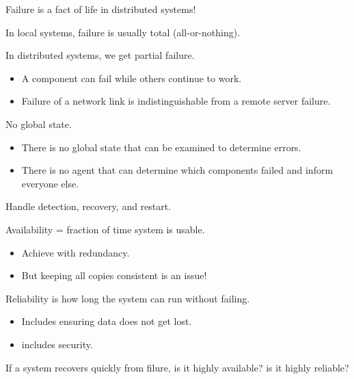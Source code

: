 \begin{slide}

	
	Failure is a fact of life in distributed systems!
	\bigskip
	
	In local systems, failure is usually total (all-or-nothing).
	\bigskip
	
	In distributed systems, we get partial failure.
	\begin{itemize}
		\item A component can fail while others continue to work.
		\item Failure of a network link is indistinguishable from a remote server failure.
	\end{itemize}
	\bigskip
	
	No global state.
	\begin{itemize}
		\item There is no global state that can be examined to determine errors.
		\item There is no agent that can determine which components failed and inform everyone else.
	\end{itemize}
	
\end{slide}

\begin{slide}

	
	Handle detection, recovery, and restart.
	\bigskip
	
	Availability = fraction of time system is usable.
	\begin{itemize}
		\item Achieve with redundancy.
		\item But keeping all copies consistent is an issue!
	\end{itemize}
	\bigskip
	
	Reliability is how long the system can run without failing.
	\begin{itemize}
		\item Includes ensuring data does not get lost.
		\item includes security.
	\end{itemize}
	\bigskip
	
	If a system recovers quickly from filure, is it highly available? is it highly reliable?
	
\end{slide}

